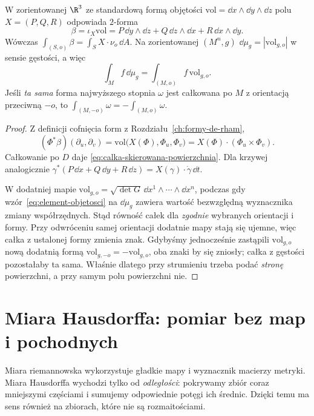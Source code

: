 \begin{stwierdzenie}
\label{prop:calka-skierowana-forma}
W zorientowanej $\R^3$ ze standardową
formą objętości $\mathrm{vol}=\dd x\wedge\dd y
\wedge\dd z$ polu $X=(P,Q,R)$ odpowiada $2$-forma
\[
 \beta=\iota_X\mathrm{vol}
 =P\,\dd y\wedge\dd z+
  Q\,\dd z\wedge\dd x+
  R\,\dd x\wedge\dd y.
\]
Wówczas $\int_{(S,o)}\beta
=\int_S X\cdot\nu_o\,\dd A$.
Na zorientowanej $(M^n,g)$
$\dd\mu_g=|\mathrm{vol}_{g,o}|$ w sensie gęstości,
a więc
\[
 \int_M f\,\dd\mu_g
 =\int_{(M,o)}f\,\mathrm{vol}_{g,o}.
\]
Jeśli \emph{ta sama} forma najwyższego stopnia
$\omega$ jest całkowana po $M$ z orientacją
przeciwną $-o$, to
$\int_{(M,-o)}\omega=-\int_{(M,o)}\omega$.
\end{stwierdzenie}
\begin{proof}
Z definicji cofnięcia form z
Rozdziału~\ref{ch:formy-de-rham},
\[
 (\Phi^*\beta)(\partial_u,\partial_v)
 =\mathrm{vol}\bigl(X(\Phi),\Phi_u,\Phi_v\bigr)
 =X(\Phi)\cdot(\Phi_u\times\Phi_v).
\]
Całkowanie po $D$ daje
\eqref{eq:calka-skierowana-powierzchnia}.
Dla krzywej analogicznie
$\gamma^*(P\,\dd x+Q\,\dd y+R\,\dd z)
=X(\gamma)\cdot\dot\gamma\,\dd t$.

W dodatniej mapie
$\mathrm{vol}_{g,o}=\sqrt{\det G}\,
\dd x^1\wedge\cdots\wedge\dd x^n$,
podczas gdy wzór~\eqref{eq:element-objetosci}
na $\dd\mu_g$ zawiera wartość bezwzględną
wyznacznika zmiany współrzędnych. Stąd
równość całek dla \emph{zgodnie} wybranych
orientacji i formy. Przy odwróceniu samej
orientacji dodatnie mapy stają się ujemne,
więc całka z ustalonej formy zmienia znak.
Gdybyśmy jednocześnie zastąpili
$\mathrm{vol}_{g,o}$ nową dodatnią formą
$\mathrm{vol}_{g,-o}=-\mathrm{vol}_{g,o}$,
oba znaki by się zniosły; całka z gęstości
pozostałaby ta sama. Właśnie dlatego
przy strumieniu trzeba podać \emph{stronę}
powierzchni, a przy samym polu powierzchni nie.
\end{proof}

\section{Miara Hausdorffa: pomiar bez map i pochodnych}
\label{sec:miara-hausdorffa}

Miara riemannowska wykorzystuje gładkie mapy
i wyznacznik macierzy metryki. Miara Hausdorffa
wychodzi tylko od \emph{odległości}: pokrywamy zbiór
coraz mniejszymi częściami i sumujemy odpowiednie
potęgi ich średnic. Dzięki temu ma sens również
na zbiorach, które nie są rozmaitościami.

